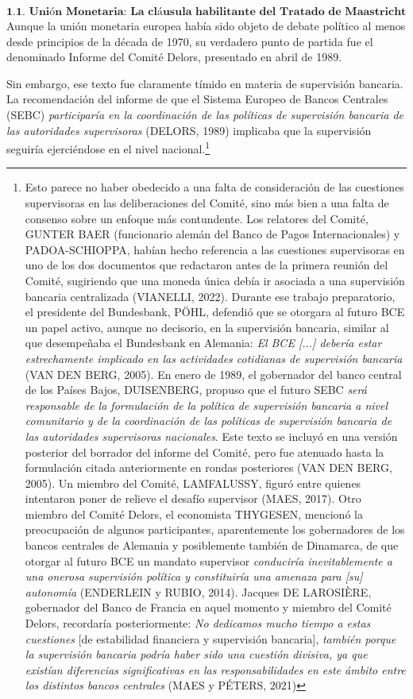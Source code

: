 \documentclass[10pt,a4paper]{article}
\begin{document}
{$$\textbf{1.1. Unión Monetaria: La cláusula habilitante del Tratado de Maastricht (1992)}$$
Aunque la unión monetaria europea había sido objeto de debate político al menos desde principios de la década de 1970, su verdadero punto de partida fue el denominado Informe del Comité Delors, presentado en abril de 1989. 

Sin embargo, ese texto fue claramente tímido en materia de supervisión bancaria. La recomendación del informe de que el Sistema Europeo de Bancos Centrales (SEBC) \textit{participaría en la coordinación de las políticas de supervisión bancaria de las autoridades supervisoras} (DELORS, 1989) implicaba que la supervisión seguiría ejerciéndose en el nivel nacional.\footnote{%
    Esto parece no haber obedecido a una falta de consideración de las cuestiones supervisoras en las deliberaciones del Comité, sino más bien a una falta de consenso sobre un enfoque más contundente. Los relatores del Comité, GUNTER BAER (funcionario alemán del Banco de Pagos Internacionales) y PADOA-SCHIOPPA, habían hecho referencia a las cuestiones supervisoras en uno de los dos documentos que redactaron antes de la primera reunión del Comité, sugiriendo que una moneda única debía ir asociada a una supervisión bancaria centralizada (VIANELLI, 2022). Durante ese trabajo preparatorio, el presidente del Bundesbank, PÖHL, defendió que se otorgara al futuro BCE un papel activo, aunque no decisorio, en la supervisión bancaria, similar al que desempeñaba el Bundesbank en Alemania: \textit{El BCE [...] debería estar estrechamente implicado en las actividades cotidianas de supervisión bancaria} (VAN DEN BERG, 2005). En enero de 1989, el gobernador del banco central de los Países Bajos, DUISENBERG, propuso que el futuro SEBC \textit{será responsable de la formulación de la política de supervisión bancaria a nivel comunitario y de la coordinación de las políticas de supervisión bancaria de las autoridades supervisoras nacionales}. Este texto se incluyó en una versión posterior del borrador del informe del Comité, pero fue atenuado hasta la formulación citada anteriormente en rondas posteriores (VAN DEN BERG, 2005). Un miembro del Comité, LAMFALUSSY, figuró entre quienes intentaron poner de relieve el desafío supervisor (MAES, 2017). Otro miembro del Comité Delors, el economista THYGESEN, mencionó la preocupación de algunos participantes, aparentemente los gobernadores de los bancos centrales de Alemania y posiblemente también de Dinamarca, de que otorgar al futuro BCE un mandato supervisor \textit{conduciría inevitablemente a una onerosa supervisión política y constituiría una amenaza para [su] autonomía} (ENDERLEIN y RUBIO, 2014). Jacques DE LAROSIÈRE, gobernador del Banco de Francia en aquel momento y miembro del Comité Delors, recordaría posteriormente: \textit{No dedicamos mucho tiempo a estas cuestiones} [de estabilidad financiera y supervisión bancaria],\textit{ también porque la supervisión bancaria podría haber sido una cuestión divisiva, ya que existían diferencias significativas en las responsabilidades en este ámbito entre los distintos bancos centrales} (MAES y PÉTERS, 2021)
}}
\end{document}
